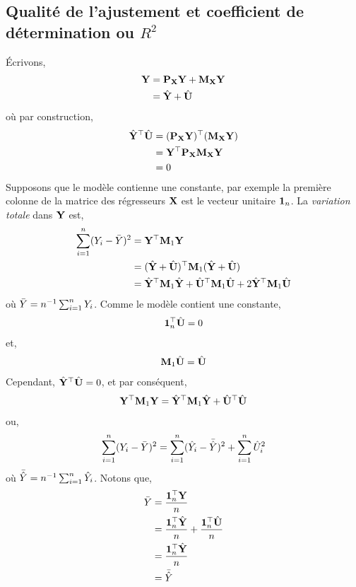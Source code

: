 \subsection{Qualité de l'ajustement et coefficient de détermination ou $R^2$}
\'Ecrivons,
\begin{align*}
\mathbf Y &= \mathbf P_\mathbf X\mathbf Y+ \mathbf M_\mathbf X\mathbf Y\\
&=\hat{\mathbf Y}+\hat{\mathbf U}
\end{align*}
où par construction,
\begin{align*}
\hat{\mathbf Y}^\top\hat{\mathbf U} &= (\mathbf P_\mathbf X\mathbf Y)^\top (\mathbf M_\mathbf X\mathbf Y)\\ 
&= \mathbf Y^\top  \mathbf P_\mathbf X \mathbf M_\mathbf X\mathbf Y\\
& = 0
\end{align*}
Supposons que le modèle contienne une constante, par exemple la première colonne de la matrice des régresseurs $\mathbf X$ est le vecteur unitaire $\mathbf{1}_n$. La \emph{variation totale} dans $\mathbf Y$ est,
\begin{align*}
\sum_{i=1}^n(Y_i - \bar{Y})^2 &= \mathbf Y^\top\mathbf M_1\mathbf Y\\
&=(\hat{\mathbf Y}  + \hat{\mathbf U} )^\top\mathbf M_1(\hat{\mathbf Y}  + \hat{\mathbf U} )\\
&=\hat{\mathbf Y}^\top\mathbf M_1\hat{\mathbf Y} + \hat{\mathbf U}^\top\mathbf M_1\hat{\mathbf U} + 2\hat{\mathbf Y}^\top\mathbf M_1\hat{\mathbf U}
\end{align*}
où $\bar{Y} = n^{-1}\sum_{i=1}^n Y_i$. Comme le modèle contient une constante,
\begin{align*}
\mathbf{1}_n^\top\hat{\mathbf U} = 0
\end{align*}
et,
\begin{align*}
\mathbf M_1\hat{\mathbf U} =\hat{\mathbf U}  
\end{align*}
Cependant, $\hat{\mathbf Y}^\top \hat{\mathbf U} =0$, et par conséquent,
\begin{align*}
\mathbf Y^\top\mathbf M_1\mathbf Y = \hat{\mathbf Y}^\top\mathbf M_1\hat{\mathbf Y} +
\hat{\mathbf U}^\top\hat{\mathbf U} 
\end{align*}
ou,
\begin{align*}
\sum_{i=1}^n(Y_i-\bar{Y})^2 = \sum_{i=1}^n(\hat{Y}_i - \bar{\hat{Y}})^2 + \sum_{i=1}^n \hat{U}_i^2
\end{align*}
où $\bar{\hat{Y}} = n^{-1}\sum_{i=1}^n \hat{Y}_i$. Notons que,
\begin{align*}
\bar{Y} &= \frac{\mathbf{1}_n^\top\mathbf Y}{n} \\
&= \frac{\mathbf{1}_n^\top\hat{\mathbf Y}}{n}
+ \frac{\mathbf{1}_n^\top\hat{\mathbf U}}{n}\\
& = \frac{\mathbf{1}_n^\top\hat{\mathbf Y}}{n} \\
&= \bar{\hat{Y}}
\end{align*}
